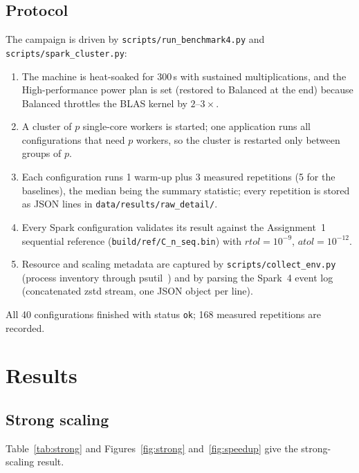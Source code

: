 \documentclass[11pt,a4paper]{article}
\begin{document}
\subsection{Protocol}

The campaign is driven by \texttt{scripts/run\_benchmark4.py} and
\texttt{scripts/spark\_cluster.py}:
\begin{enumerate}
  \item The machine is heat-soaked for 300\,s with sustained
        multiplications, and the High-performance power plan is set
        (restored to Balanced at the end) because Balanced throttles the
        BLAS kernel by $2$--$3\times$.
  \item A cluster of $p$ single-core workers is started; one
        application runs all configurations that need $p$ workers, so
        the cluster is restarted only between groups of $p$.
  \item Each configuration runs 1 warm-up plus 3 measured
        repetitions (5 for the baselines), the median being the
        summary statistic; every repetition is stored as JSON lines in
        \texttt{data/results/raw\_detail/}.
  \item Every Spark configuration validates its result against the
        Assignment~1 sequential reference
        (\texttt{build/ref/C\_n\_seq.bin}) with
        $\textit{rtol}=10^{-9}$, $\textit{atol}=10^{-12}$.
  \item Resource and scaling metadata are captured by
        \texttt{scripts/collect\_env.py} (process inventory through
        psutil~\cite{psutil}) and by parsing the Spark~4
        event log (concatenated zstd stream, one JSON object per line).
\end{enumerate}
All 40 configurations finished with status \texttt{ok}; 168 measured
repetitions are recorded.

\section{Results}

\subsection{Strong scaling}

Table~\ref{tab:strong} and Figures~\ref{fig:strong}
and~\ref{fig:speedup} give the strong-scaling result.
\end{document}
